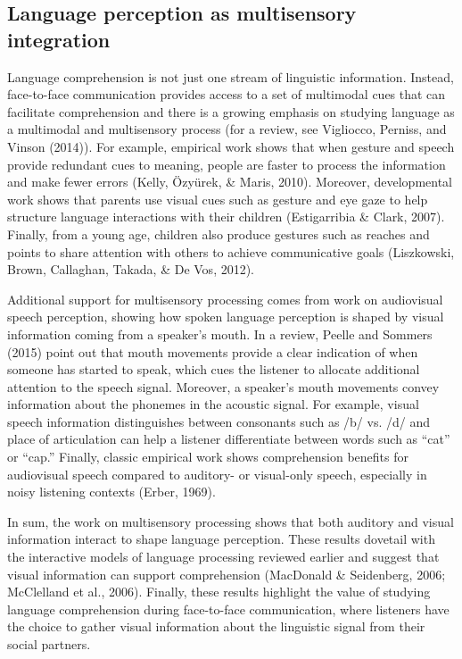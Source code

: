 \documentclass[english,floatsintext,man]{apa6}
\begin{document}
\hypertarget{language-perception-as-multisensory-integration}{%
\subsection{Language perception as multisensory
integration}\label{language-perception-as-multisensory-integration}}

Language comprehension is not just one stream of linguistic information.
Instead, face-to-face communication provides access to a set of
multimodal cues that can facilitate comprehension and there is a growing
emphasis on studying language as a multimodal and multisensory process
(for a review, see Vigliocco, Perniss, and Vinson (2014)). For example,
empirical work shows that when gesture and speech provide redundant cues
to meaning, people are faster to process the information and make fewer
errors (Kelly, Özyürek, \& Maris, 2010). Moreover, developmental work
shows that parents use visual cues such as gesture and eye gaze to help
structure language interactions with their children (Estigarribia \&
Clark, 2007). Finally, from a young age, children also produce gestures
such as reaches and points to share attention with others to achieve
communicative goals (Liszkowski, Brown, Callaghan, Takada, \& De Vos,
2012).

Additional support for multisensory processing comes from work on
audiovisual speech perception, showing how spoken language perception is
shaped by visual information coming from a speaker's mouth. In a review,
Peelle and Sommers (2015) point out that mouth movements provide a clear
indication of when someone has started to speak, which cues the listener
to allocate additional attention to the speech signal. Moreover, a
speaker's mouth movements convey information about the phonemes in the
acoustic signal. For example, visual speech information distinguishes
between consonants such as /b/ vs. /d/ and place of articulation can
help a listener differentiate between words such as \enquote{cat} or
\enquote{cap.} Finally, classic empirical work shows comprehension
benefits for audiovisual speech compared to auditory- or visual-only
speech, especially in noisy listening contexts (Erber, 1969).

In sum, the work on multisensory processing shows that both auditory and
visual information interact to shape language perception. These results
dovetail with the interactive models of language processing reviewed
earlier and suggest that visual information can support comprehension
(MacDonald \& Seidenberg, 2006; McClelland et al., 2006). Finally, these
results highlight the value of studying language comprehension during
face-to-face communication, where listeners have the choice to gather
visual information about the linguistic signal from their social
partners.
\end{document}
